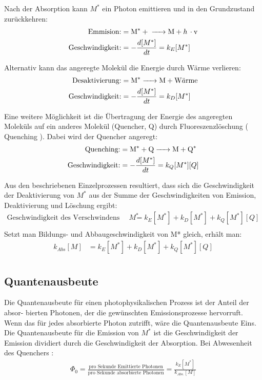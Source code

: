 \documentclass[12pt]{article}
\begin{document}
Nach der Absorption kann $M^*$ ein Photon emittieren und in den Grundzustand zurückkehren:
\begin{align*}
 \text{Emmision:} &= \ce{M^* + -> M +  h \cdot v}\\
 \text{Geschwindigkeit:} &= - \frac{d[M^*]}{dt} = k _{E} [M^*]
\end{align*}

Alternativ kann das angeregte Molekül die Energie durch Wärme verlieren:
\begin{align*}
 \text{Desaktivierung:} &= \ce{M^* -> M +  W\ddot{a}rme}\\
 \text{Geschwindigkeit:} &= - \frac{d[M^*]}{dt} = k _{D} [M^*]
\end{align*}


Eine weitere Möglichkeit ist die Übertragung der Energie des angeregten Moleküls auf ein
anderes Molekül (Quencher, Q) durch Fluoreszenzlöschung ( Quenching ). Dabei wird
der Quencher angeregt:
\begin{align*}
 \text{Quenching:} &= \ce{M^* + Q -> M +  Q^*}\\
 \text{Geschwindigkeit:} &= - \frac{d[M^*]}{dt} = k _{Q} [M^*] [Q]
\end{align*}

Aus den beschriebenen Einzelprozessen resultiert, dass sich die Geschwindigkeit der Deaktivierung von $M^*$ aus der Summe der Geschwindigkeiten von Emission, Deaktivierung
und Löschung ergibt:
\begin{align*}
 \text{Geschwindigkeit des Verschwindens von } M^* &=  k _{E} [M^*] + k _{D} [M^*] + k _{Q} [M^*] [Q]\\
\end{align*}
Setzt man Bildungs- und Abbaugeschwindigkeit von M* gleich, erhält man:
\begin{align*}
 k_{Abs} [M] &=  k _{E} [M^*] + k _{D} [M^*] + k _{Q} [M^*] [Q]\\
\end{align*}
\subsection{Quantenausbeute\supercite{harris}} %
\label{ssub:quantenausbeute}

\grqq Die Quantenausbeute für einen photophysikalischen Prozess ist der Anteil der absor-
bierten Photonen, der die gewünschten Emissionsprozesse hervorruft. Wenn das für jedes
absorbierte Photon zutrifft, wäre die Quantenausbeute Eins.\grqq
Die Quantenausbeute für die Emission von $M^*$ ist die Geschwindigkeit der Emission
dividiert durch die Geschwindigkeit der Absorption. Bei Abwesenheit des Quenchers :
\begin{align*}
  \Phi _0 = \frac{\text{pro Sekunde Emittierte Photonen}}{\text{pro Sekunde absorbierte Photonen}} = \frac{k_{E} [M^*]}{k_{Abs.} [M]}
\end{align*}
\end{document}
